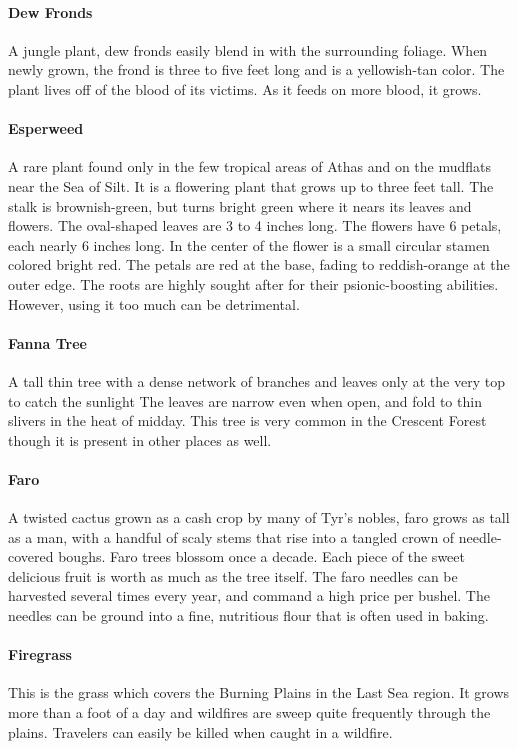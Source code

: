 \begin{multicols}{2}
\paragraph{Dew Fronds}
A jungle plant, dew fronds easily blend in with the surrounding foliage. When
newly grown, the frond is three to five feet long and is a yellowish-tan color.
The plant lives off of the blood of its victims. As it feeds on more blood,
it grows.

\paragraph{Esperweed}
A rare plant found only in the few tropical areas of Athas and on the mudflats
near the Sea of Silt. It is a flowering plant that grows up to three feet tall.
The stalk is brownish-green, but turns bright green where it nears its leaves
and flowers. The oval-shaped leaves are 3 to 4 inches long. The flowers have 6
petals, each nearly 6 inches long. In the center of the flower is a small
circular stamen colored bright red. The petals are red at the base, fading to
reddish-orange at the outer edge. The roots are highly sought after for their
psionic-boosting abilities. However, using it too much can be detrimental.

\paragraph{Fanna Tree}
A tall thin tree with a dense network of branches and leaves only at the very
top to catch the sunlight The leaves are narrow even when open, and fold to
thin slivers in the heat of midday. This tree is very common in the Crescent
Forest though it is present in other places as well.

\paragraph{Faro}
A twisted cactus grown as a cash crop by many of Tyr's nobles, faro grows as
tall as a man, with a handful of scaly stems that rise into a tangled crown
of needle-covered boughs. Faro trees blossom once a decade. Each piece of
the sweet delicious fruit is worth as much as the tree itself. The faro
needles can be harvested several times every year, and command a high price
per bushel. The needles can be ground into a fine, nutritious flour that is
often used in baking.

\paragraph{Firegrass}
This is the grass which covers the Burning Plains in the Last Sea region. It
grows more than a foot of a day and wildfires are sweep quite frequently
through the plains. Travelers can easily be killed when caught in a wildfire.


\end{multicols}
